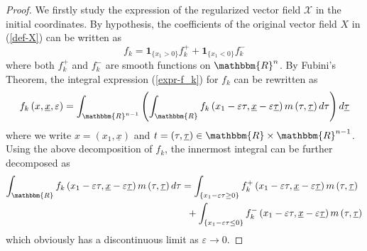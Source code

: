 \documentclass[10pt,a4paper]{amsart}
\newcommand{\cR}{\ensuremath{\mathbbm{R}}}
\newcommand{\eps}{\varepsilon }
\newcommand{\tmmathbf}[1]{\ensuremath{\boldsymbol{#1}}}
\newcommand{\vf}{f}
\begin{document}
\begin{proof}
We firstly study the expression of the regularized vector field $\mathcal{X}$ in the initial coordinates. 
By hypothesis, the coefficients of the original vector field $X$ in (\ref{def-X}) can be written as
\begin{equation}\label{coeff-fkX}
\vf_k = \tmmathbf{1}_{\{ x_1 > 0 \}} \vf_{k }^+ + \tmmathbf{1}_{\{ x_1 < 0 \}} \vf_{k }^- 
\end{equation}
where both $\vf_k^+$ and $\vf_k^-$ are smooth functions on $\cR^n$. 
By Fubini's Theorem, the integral expression (\ref{expr-f_k}) for $f_k$ can be rewritten as
\begin{equation}\label{Fubini-f_k}
  f_k \left( x, \underline{x}, \eps  \right) = \int_{\cR^{n - 1}}
  \left( \int_{\cR}  \vf_k \left( x_1- \eps \tau, \underline{x} -
  \eps  \underline{\tau} \right) m \left( \tau, \underline{\tau} \right)
  d \tau \right) d \underline{\tau}
\end{equation}
where we write $x = (x_1,\underline{x})$ and $t = (\tau,\underline{\tau}) \in \cR \times \cR^{n-1}$. Using the above decomposition of $\vf_k$, the innermost integral can be further decomposed as 
{\small \begin{align}\label{equation-integexpr}
\int_{\cR} 
   \vf_k \left( x_1- \eps \tau, \underline{x} -
  \eps  \underline{\tau} \right) m \left( \tau, \underline{\tau} \right) d\tau
   &= \int_{\{ x_1- \eps \tau \ge 0 \}} 
        \vf_k^+ \left( x_1- \eps \tau, \underline{x} -
  \eps  \underline{\tau} \right) m \left( \tau, \underline{\tau} \right)  \\
   &\;\;+ \int_{\{ x_1- \eps \tau \le 0 \}} 
        \vf_k^- \left( x_1- \eps \tau, \underline{x} -
  \eps  \underline{\tau} \right) m \left( \tau, \underline{\tau} \right) \notag
\end{align}}
which obviously has a discontinuous limit as $\eps \rightarrow 0$. 


\end{proof}
\end{document}
